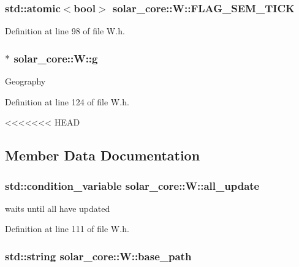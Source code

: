 \subsubsection[{F\+L\+A\+G\+\_\+\+S\+E\+M\+\_\+\+T\+I\+C\+K}]{\setlength{\rightskip}{0pt plus 5cm}std\+::atomic$<$bool$>$ solar\+\_\+core\+::\+W\+::\+F\+L\+A\+G\+\_\+\+S\+E\+M\+\_\+\+T\+I\+C\+K}\label{classsolar__core_1_1_w_ae383b7a595cb28d52aa747fc7e5bb619}


Definition at line 98 of file W.\+h.

\hypertarget{classsolar__core_1_1_w_a9e50ef0da579cdfc3da22c16a492bc44}{}
\subsubsection[{g}]{$\ast$ solar\+\_\+core\+::\+W\+::g}\label{classsolar__core_1_1_w_a9e50ef0da579cdfc3da22c16a492bc44}
Geography 

Definition at line 124 of file W.\+h.

<<<<<<< HEAD
\subsection{Member Data Documentation}
\hypertarget{classsolar__core_1_1_w_aa6cba0dba8a566978e51fb4204aac4b9}{}
\subsubsection[{all\+\_\+update}]{\setlength{\rightskip}{0pt plus 5cm}std\+::condition\+\_\+variable solar\+\_\+core\+::\+W\+::all\+\_\+update}\label{classsolar__core_1_1_w_aa6cba0dba8a566978e51fb4204aac4b9}
waits until all have updated 

Definition at line 111 of file W.\+h.

\hypertarget{classsolar__core_1_1_w_acf6e7dd195573ba04b406cde2e5b80fb}{}
\subsubsection[{base\+\_\+path}]{\setlength{\rightskip}{0pt plus 5cm}std\+::string solar\+\_\+core\+::\+W\+::base\+\_\+path}\label{classsolar__core_1_1_w_acf6e7dd195573ba04b406cde2e5b80fb}


